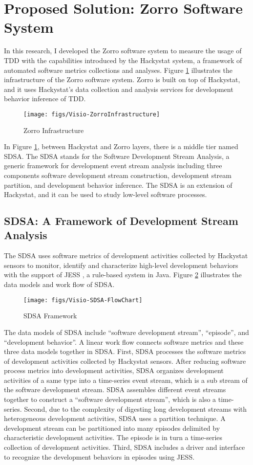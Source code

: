 \section{Proposed Solution: Zorro Software System}
In this research, I developed the Zorro software system to measure the usage of TDD with the capabilities introduced by the Hackystat system, a framework of automated software metrics collections and analyses.  Figure \ref{fig:ZorroInfrastructure} illustrates the infrastructure of the Zorro software system. Zorro is built on top of Hackystat, and it uses Hackystat's data collection and analysis services for development behavior inference of TDD. 
\begin{figure}[htbp]
  \centering
  \texttt{[image: figs/Visio-ZorroInfrastructure]}
  \caption{Zorro Infrastructure}
  \label{fig:ZorroInfrastructure}
\end{figure}
In Figure \ref{fig:ZorroInfrastructure}, between Hackystat and Zorro layers, there is a middle tier named SDSA. The SDSA stands for the Software Development Stream Analysis, a generic framework for development event stream analysis including three components \textemdash software development stream construction, development stream partition, and development behavior inference. The SDSA is an extension of Hackystat, and it can be used to study low-level software processes.

\subsection{SDSA: A Framework of Development Stream Analysis}
The SDSA uses software metrics of development activities collected by Hackystat sensors to monitor, identify and characterize high-level development behaviors with the support of JESS \cite{Friedman-Hill:03}, a rule-based system in Java. Figure \ref{fig:Intro-SDSA-Workflow} illustrates the data models and work flow of SDSA. 
\begin{figure}[htbp]
  \centering
  \texttt{[image: figs/Visio-SDSA-FlowChart]}
  \caption{SDSA Framework}
  \label{fig:Intro-SDSA-Workflow}
\end{figure}
The data models of SDSA include ``software development stream'', ``episode'', and ``development behavior''. A linear work flow connects software metrics and these three data models together in SDSA. First, SDSA processes the software metrics of development activities collected by Hackystat sensors. After reducing software process metrics into development activities, SDSA organizes development activities of a same type into a time-series event stream, which is a sub stream of the software development stream. SDSA assembles different event streams together to construct a ``software development stream'', which is also a time-series. Second, due to the complexity of digesting long development streams with heterogeneous development activities, SDSA uses a partition technique. A development stream can be partitioned into many episodes delimited by characteristic development activities. The episode is in turn a time-series collection of development activities. Third, SDSA includes a driver and interface to recognize the development behaviors in episodes using JESS. 

